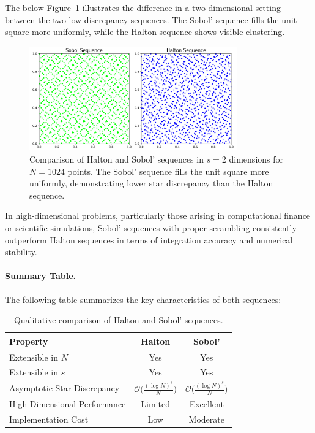The below Figure~\ref{fig:dimensional-comparison} illustrates the difference in
a two-dimensional setting between the two low discrepancy sequences. The Sobol'
sequence fills the unit square more uniformly, while the Halton sequence shows
visible clustering.

\begin{figure}[H]
\label{fig:dimensional-comparison}
\centering
\includegraphics[width=0.8\textwidth]{Figures/sobol-vs-halton.png}
\caption{Comparison of Halton and Sobol' sequences in $s=2$ dimensions for
$N=1024$ points. The Sobol' sequence fills the unit square more uniformly,
demonstrating lower star discrepancy than the Halton sequence.}
\label{fig:dimensional-comparison}
\end{figure}

\begin{remark}
In high-dimensional problems, particularly those arising in computational
finance or scientific simulations, Sobol' sequences with proper scrambling
consistently outperform Halton sequences in terms of integration accuracy and
numerical stability.
\end{remark}

\paragraph{Summary Table.}
The following table summarizes the key characteristics of both sequences:

\begin{table}[H]
\centering
\begin{tabular}{lcc}
\toprule
\textbf{Property} & \textbf{Halton} & \textbf{Sobol'} \\
\midrule
Extensible in $N$          & Yes  & Yes \\
Extensible in $s$          & Yes  & Yes \\
Asymptotic Star Discrepancy & $\mathcal{O}\big(\frac{(\log N)^s}{N}\big)$ & $\mathcal{O}\big(\frac{(\log N)^s}{N}\big)$ \\
High-Dimensional Performance & Limited & Excellent \\
Implementation Cost         & Low & Moderate \\
\bottomrule
\end{tabular}
\caption{Qualitative comparison of Halton and Sobol' sequences.}
\label{tab:halton-sobol-comparison}
\end{table}

